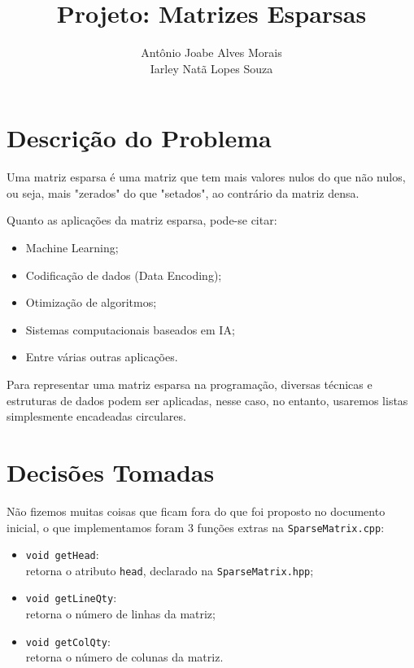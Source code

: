 \documentclass[12pt, letterpaper]{article}
\title{\textbf{Projeto: Matrizes Esparsas}}
\date{}
\author{Antônio Joabe Alves Morais \\ Iarley Natã Lopes Souza}
\begin{document}
	\maketitle

	\section{Descrição do Problema} \label{descr}
		Uma matriz esparsa é uma matriz que tem mais valores nulos do que não nulos, ou seja, mais "zerados" do que "setados", ao contrário da matriz densa.

		Quanto as aplicações da matriz esparsa, pode-se citar: \cite{Brownlee2018, UnivespME2016, Cerebras2019}
		\begin{itemize}
			\item Machine Learning;
			\item Codificação de dados (Data Encoding);
			\item Otimização de algoritmos;
			\item Sistemas computacionais baseados em IA;
			\item Entre várias outras aplicações.
		\end{itemize}

		Para representar uma matriz esparsa na programação, diversas técnicas e estruturas de dados podem ser aplicadas, nesse caso, no entanto, usaremos listas simplesmente encadeadas circulares.
	\section{Decisões Tomadas} \label{decis}
		Não fizemos muitas coisas que ficam fora do que foi proposto no documento inicial, o que implementamos foram 3 funções extras na \verb|SparseMatrix.cpp|:
		\begin{itemize}
			\item \verb|void getHead|: \\
				retorna o atributo \verb|head|, declarado na \verb|SparseMatrix.hpp|;
			\item \verb|void getLineQty|: \\
				retorna o número de linhas da matriz;
			\item \verb|void getColQty|: \\
				retorna o número de colunas da matriz.
		\end{itemize}
\end{document}
